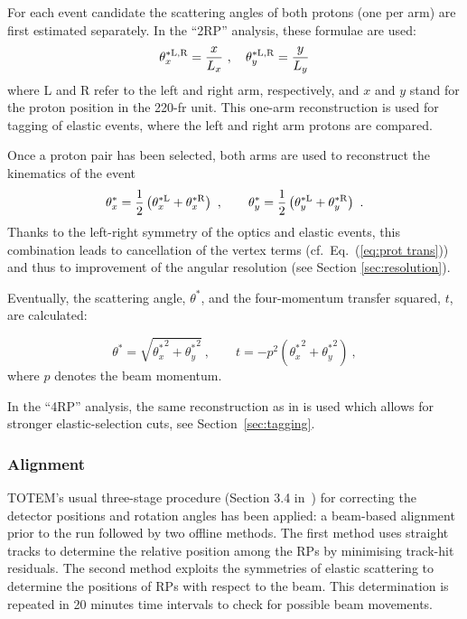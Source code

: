 For each event candidate the scattering angles of both protons (one per arm) are first estimated separately. In the ``2RP'' analysis, these formulae are used:
\begin{equation}
\label{eq:kin 1a}
	\theta^{*\rm L,R}_x = {x\over L_x}\ ,\quad \theta^{*\rm L,R}_y = {y\over L_y}
\end{equation}
where L and R refer to the left and right arm, respectively, and $x$ and $y$ stand for the proton position in the 220-fr unit. This one-arm reconstruction is used for tagging of elastic events, where the left and right arm protons are compared.

Once a proton pair has been selected, both arms are used to reconstruct the kinematics of the event
\begin{equation}
\label{eq:kin 2a}
		\theta_x^* = {1\over 2} \left( \theta^{*\rm L}_x + \theta^{*\rm R}_x \right)\ ,\qquad
		\theta_y^* = {1\over 2} \left( \theta^{*\rm L}_y + \theta^{*\rm R}_y \right)\ .
\end{equation}
Thanks to the left-right symmetry of the optics and elastic events, this combination leads to cancellation of the vertex terms (cf.~Eq.~(\ref{eq:prot trans})) and thus to improvement of the angular resolution (see Section \ref{sec:resolution}).

Eventually, the scattering angle, $\theta^*$, and the four-momentum transfer squared, $t$, are calculated:

\begin{equation}
\label{eq:th t}
\theta^* = \sqrt{{\theta_x^*}^2 + {\theta_y^*}^2}\ ,\qquad t = - p^2 ({\theta_x^*}^2 + {\theta_y^*}^2)\ ,
\end{equation}
where $p$ denotes the beam momentum.

In the ``4RP'' analysis, the same reconstruction as in \cite{totem-8tev-1km} is used which allows for stronger elastic-selection cuts, see Section~\ref{sec:tagging}.




\subsubsection{Alignment}
\label{sec:alignment}

TOTEM's usual three-stage procedure (Section 3.4 in~\cite{totem-ijmp}) for correcting the detector positions and rotation angles has been applied: a beam-based alignment prior to the run followed by two offline methods. The first method uses straight tracks to determine the relative position among the RPs by minimising track-hit residuals. The second method exploits the symmetries of elastic scattering to determine the positions of RPs with respect to the beam. This determination is repeated in 20 minutes time intervals to check for possible beam movements.

